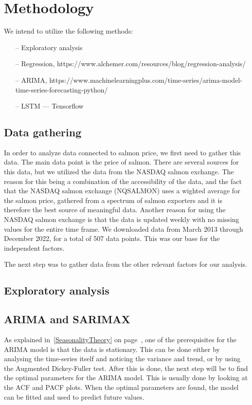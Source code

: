 \section{Methodology}

We intend to utilize the following methods:
\begin{itemize}
    \item[--] Exploratory analysis
    \item[--] Regression, https://www.alchemer.com/resources/blog/regression-analysis/
    \item[--] ARIMA, https://www.machinelearningplus.com/time-series/arima-model-time-series-forecasting-python/
    \item[--] LSTM --- Tensorflow
    \end{itemize}

\subsection{Data gathering}
In order to analyze data connected to salmon price, we first need to gather this data. 
The main data point is the price of salmon. There are several sources for this data, but we utilized the data from the NASDAQ salmon exchange.
The reason for this being a combination of the accessibility of the data, and the fact that the NASDAQ salmon exchange (NQSALMON)
uses a wighted average for the salmon price, gathered from a spectrum of salmon exporters and it is therefore the best source of meaningful data.
Another reason for using the NASDAQ salmon exchange is that the data is updated weekly with no missing values for the entire time frame.
We downloaded data from March 2013 through December 2022, for a total of 507 data points. This was our base for the independent factors.

The next step was to gather data from the other relevant factors for our analysis. 


\subsection{Exploratory analysis}

\subsection{ARIMA and SARIMAX}

As explained in~\ref{SeasonalityTheory} on page~\pageref{SeasonalityTheory}, one of the prerequisites for the ARIMA model is that the data is stationary. This can be done either by analysing the time-series itself and noticing the variance and trend, or by using the Augmented Dickey-Fuller test. 
After this is done, the next step will be to find the optimal parameters for the ARIMA model. This is usually done by looking at the ACF and PACF plots. 
When the optimal parameters are found, the model can be fitted and used to predict future values. \parencite{hyndman_athanasopoulos_2021}

